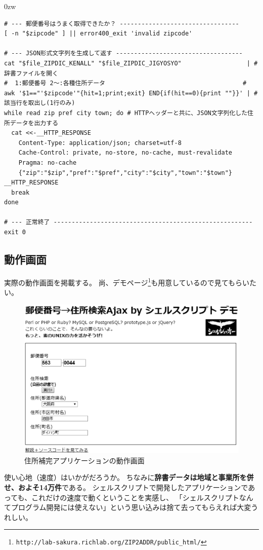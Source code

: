 \begin{indentation}{-9mm}{0zw}
\begin{verbatim}
# --- 郵便番号はうまく取得できたか？ ---------------------------------
[ -n "$zipcode" ] || error400_exit 'invalid zipcode'

# --- JSON形式文字列を生成して返す -----------------------------------
cat "$file_ZIPDIC_KENALL" "$file_ZIPDIC_JIGYOSYO"                  | # 辞書ファイルを開く
#  1:郵便番号 2～:各種住所データ                                      #
awk '$1=="'$zipcode'"{hit=1;print;exit} END{if(hit==0){print ""}}' | # 該当行を取出し(1行のみ)
while read zip pref city town; do # HTTPヘッダーと共に、JSON文字列化した住所データを出力する
  cat <<-__HTTP_RESPONSE
    Content-Type: application/json; charset=utf-8
    Cache-Control: private, no-store, no-cache, must-revalidate
    Pragma: no-cache
    {"zip":"$zip","pref":"$pref","city":"$city","town":"$town"}
__HTTP_RESPONSE
  break
done

# --- 正常終了 -------------------------------------------------------
exit 0
\end{verbatim}
\end{indentation}

\subsection*{動作画面}

実際の動作画面を掲載する。
尚、デモページ\footnote{\verb|http://lab-sakura.richlab.org/ZIP2ADDR/public_html/|}も用意しているので見てもらいたい。

\begin{figure}[htb]
	\begin{center}
		\vspace{10mm}
		\includegraphics*[scale=0.60]{tex/6_cookingexample/figs/zip2addr_screenshot.eps}
		\vspace{0mm}
		\caption{住所補完アプリケーションの動作画面}
		\label{fig:metropiper_hanzomon}
		\vspace{0mm}
	\end{center}
\end{figure}

使い心地（速度）はいかがだろうか。
ちなみに\textbf{辞書データは地域と事業所を併せ、およそ14万件}である。
シェルスクリプトで開発したアプリケーションであっても、これだけの速度で動くということを実感し、
「シェルスクリプトなんてプログラム開発には使えない」という思い込みは捨て去ってもらえれば大変うれしい。
